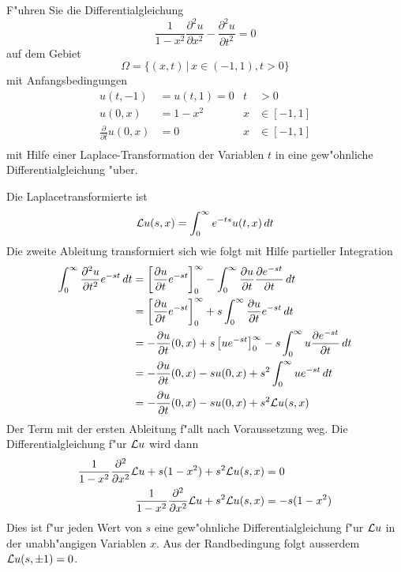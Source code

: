 F"uhren Sie die Differentialgleichung
\[
\frac1{1-x^2}\frac{\partial^2 u}{\partial x^2}
-
\frac{\partial^2 u}{\partial t^2}=0
\]
auf dem Gebiet
\[
\Omega=\{(x,t)\,|\, x\in (-1,1), t>0\}
\]
mit Anfangsbedingungen
\begin{align*}
u(t,-1)&=u(t,1)=0&t&>0\\
u(0,x)&=1-x^2&x&\in[-1,1]\\
\frac{\partial}{\partial t}u(0,x)&=0&x&\in[-1,1]\\
\end{align*}
mit Hilfe einer Laplace-Transformation der Variablen $t$ in eine
gew"ohnliche Differentialgleichung "uber.

\begin{loesung}
Die Laplacetransformierte ist
\[
{\cal L}u(s,x)=\int_0^{\infty}e^{-ts}u(t,x)\,dt
\]
Die zweite Ableitung transformiert sich wie folgt mit Hilfe
partieller Integration
\begin{align*}
\int_0^\infty \frac{\partial^2u}{\partial t^2}e^{-st}\,dt
&=
\left[
\frac{\partial u}{\partial t}e^{-st}
\right]_0^\infty
-\int_0^\infty
\frac{\partial u}{\partial t}\frac{\partial e^{-st}}{\partial t}
\,dt
\\
&=
\left[
\frac{\partial u}{\partial t}e^{-st}
\right]_0^\infty
+s\int_0^\infty
\frac{\partial u}{\partial t}e^{-st}
\,dt
\\
&=
-\frac{\partial u}{\partial t}(0,x)
+s\left[
ue^{-st}
\right]_0^\infty
-s\int_0^\infty u\frac{\partial e^{-st}}{\partial t}\,dt
\\
&=
-\frac{\partial u}{\partial t}(0,x)
-s
u(0,x)
+s^2\int_0^\infty u e^{-st}\,dt
\\
&=
-\frac{\partial u}{\partial t}(0,x)
-su(0,x)+s^2{\cal L}u(s,x)
\end{align*}
Der Term mit der ersten Ableitung f"allt nach Voraussetzung weg.
Die Differentialgleichung f"ur ${\cal L}u$ wird dann
\begin{align*}
\frac1{1-x^2}\frac{\partial^2}{\partial x^2}{\cal L}u
+s(1-x^2)+s^2{\cal L}u(s,x)
&=0
\\
\frac1{1-x^2}\frac{\partial^2}{\partial x^2}{\cal L}u
+s^2{\cal L}u(s,x)
&=-s(1-x^2)
\end{align*}
Dies ist f"ur jeden Wert von $s$ eine gew"ohnliche Differentialgleichung
f"ur ${\cal L}u$ in der unabh"angigen Variablen $x$.
Aus der Randbedingung folgt ausserdem ${\cal L}u(s,\pm 1)=0$.
\end{loesung}
